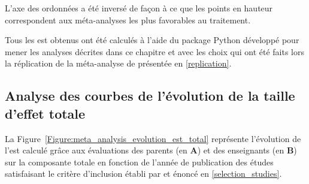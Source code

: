 L'axe des ordonnées a été inversé de façon à ce que les points en hauteur correspondent aux méta-analyses les plus favorables au traitement.

Tous les \gls{est} obtenus ont été calculés à l'aide du package Python développé pour mener les analyses décrites dans ce chapitre
\citep{Bussalb2019clinical} et avec les choix qui ont été faits lors la réplication de la méta-analyse de \citet{Cortese2016} présentée en \ref{replication}.


\subsection{Analyse des courbes de l'évolution de la taille d'effet totale}

La Figure~\ref{Figure:meta_analysis_evolution_est_total} représente l'évolution de l'\gls{est} calculé grâce aux évaluations des parents (en \textbf{A}) et des 
enseignants (en \textbf{B}) sur la composante totale en fonction de l'année de publication des études satisfaisant le critère d'inclusion établi par \citep{Cortese2016} et énoncé en 
\ref{selection_studies}.

